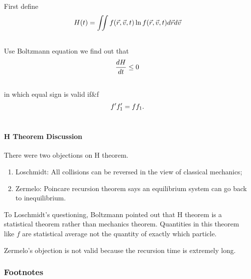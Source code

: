 \documentclass[letterpaper,10pt,english]{sphinxmanual}
\begin{document}
First define
\begin{gather}
\begin{split}H(t) = \iint  f(\vec r, \vec v, t) \ln  f(\vec r, \vec v, t) d\vec r d\vec v\end{split}\notag\\\begin{split}\end{split}\notag
\end{gather}
Use Boltzmann equation we find out that
\begin{gather}
\begin{split}\frac{d H}{dt} \leq 0\end{split}\notag\\\begin{split}\end{split}\notag
\end{gather}
in which equal sign is valid if\&f
\begin{gather}
\begin{split}f' f_1' = f f_1 .\end{split}\notag\\\begin{split}\end{split}\notag
\end{gather}

\paragraph{H Theorem Discussion}
\label{nonequilibrium/week8:h-theorem-discussion}
There were two objections on H theorem.
\begin{enumerate}
\item {} 
Loschmidt: All collisions can be reversed in the view of classical mechanics;

\item {} 
Zermelo: Poincare recursion theorem says an equilibrium system can go back to inequilibrium.

\end{enumerate}

To Loschmidt's questioning, Boltzmann pointed out that H theorem is a statistical theorem rather than mechanics theorem. Quantities in this theorem like $f$ are statistical average not the quantity of exactly which particle.

Zermelo's objection is not valid because the recursion time is extremely long.


\subsubsection{Footnotes}
\label{nonequilibrium/week8:footnotes}
\end{document}
